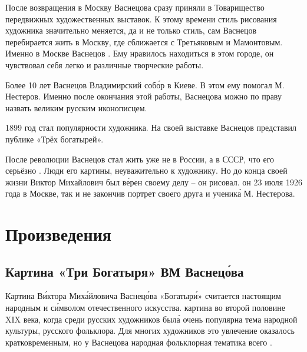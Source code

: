 После возвращения в Москву Васнецова сразу приняли в Товарищество передвижных художественных выставок. К этому времени стиль рисования художника значительно меняется, да и не только стиль, сам Васнецов перебирается жить в Москву, где сближается с Третьяковым и Мамонтовым. Именно в Москве Васнецов . Ему нравилось находиться в этом городе, он чувствовал себя легко и  различные творческие работы.

Более 10 лет Васнецов  Владимирский соб\'{о}р в Киеве. В этом ему помогал М. Нестеров. Именно после окончания этой работы, Васнецова можно по праву назвать великим русским иконописцем.

1899 год стал  популярности художника. На своей выставке Васнецов представил публике «Трёх богатырей».

После революции Васнецов стал жить уже не в России, а в СССР, что его серьёзно . Люди  его картины,  неуважительно к художнику. Но до конца своей жизни Виктор Михайлович был в\'{е}рен своему делу -- он рисовал.  он 23 июля 1926 года в Москве, так и не закончив портрет своего друга и ученик\'{а} М. Нестерова.


\section{Произведения}
\subsection{Картина «Три Богатыря» ВМ Васнец\'{о}ва}

Картина В\'{и}ктора Мих\'{а}йловича Васнец\'{о}ва «Богатыр\'{и}»  считается настоящим народным  и с\'{и}мволом отечественного искусства.  картина во второй половине XIX века, когда среди русских художников был\'{а} очень популярна тема народной культуры, русского фольклора. Для многих художников это увлечение оказалось кратковременным, но у Васнецова народная фольклорная тематика   всего .

